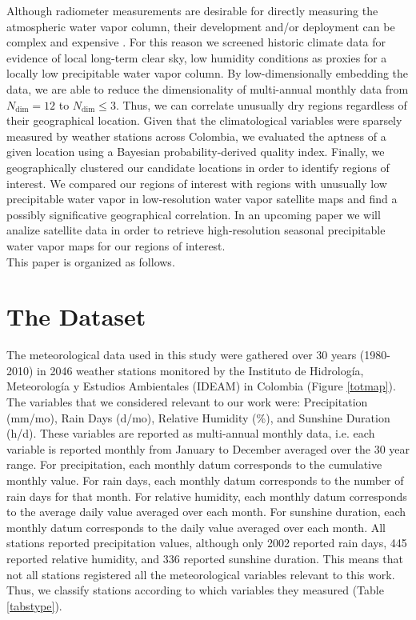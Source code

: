 \documentclass[12pt]{iopart}
\begin{document}
Although radiometer measurements are desirable for directly measuring the atmospheric water vapor column, their development and/or deployment can be complex and expensive \cite{radiopro,receiver}. For this reason we screened historic climate data for evidence of local long-term clear sky, low humidity conditions as proxies for a locally low precipitable water vapor column. By low-dimensionally embedding the data, we are able to reduce the dimensionality of multi-annual monthly data from $N_\mathrm{dim}=12$ to $N_\mathrm{dim}\le3$. Thus, we can correlate unusually dry regions regardless of their geographical location. Given that the climatological variables were sparsely measured by weather stations across Colombia, we evaluated the aptness of a given location using a Bayesian probability-derived quality index. Finally, we geographically clustered our candidate locations in order to identify regions of interest. We compared our regions of interest with regions with unusually low precipitable water vapor in low-resolution water vapor satellite maps \cite{suen2016} and find a possibly significative geographical correlation.  In an upcoming paper we will analize satellite data in order to retrieve high-resolution seasonal precipitable water vapor maps for our regions of interest.\\

This paper is organized as follows.
  
  
\section{The Dataset}

The meteorological data used in this study were gathered over 30 years (1980-2010) in 2046 weather stations monitored by the Instituto de Hidrolog\'ia, Meteorolog\'ia y Estudios Ambientales (IDEAM) in Colombia (Figure \ref{totmap}). The  variables that we considered relevant to our work were: Precipitation (mm/mo), Rain Days (d/mo),  Relative Humidity (\%), and Sunshine Duration (h/d). These variables are reported as multi-annual monthly data, i.e. each variable is reported monthly from January to December averaged over the 30 year range. For precipitation, each monthly datum corresponds to the cumulative monthly value.  For rain days, each monthly datum corresponds to the number of rain days for that month.  For relative humidity, each monthly datum corresponds to the  average daily value averaged over each month. For sunshine duration, each monthly datum corresponds to the daily value averaged over each month. All stations reported precipitation values, although only 2002 reported rain days, 445 reported relative humidity, and 336 reported sunshine duration. This means that not all stations registered all the meteorological variables relevant to this work. Thus, we classify stations according to which variables they measured (Table \ref{tabstype}).\\
\end{document}
